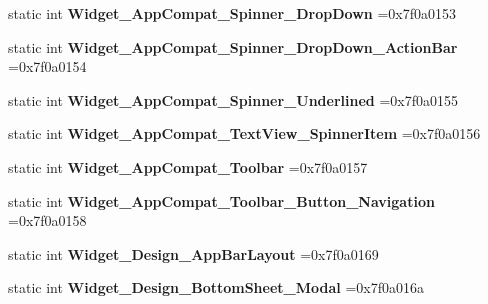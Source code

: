 \begin{DoxyCompactItemize}
static int {\bfseries Widget\+\_\+\+App\+Compat\+\_\+\+Spinner\+\_\+\+Drop\+Down} =0x7f0a0153
\item 
\mbox{\label{classandroid_1_1support_1_1v7_1_1appcompat_1_1R_1_1style_ad6537f6329d2c528f51d177fddea6053}} 
static int {\bfseries Widget\+\_\+\+App\+Compat\+\_\+\+Spinner\+\_\+\+Drop\+Down\+\_\+\+Action\+Bar} =0x7f0a0154
\item 
\mbox{\label{classandroid_1_1support_1_1v7_1_1appcompat_1_1R_1_1style_a530ac922b6f0d53b367acf7b0aa8417e}} 
static int {\bfseries Widget\+\_\+\+App\+Compat\+\_\+\+Spinner\+\_\+\+Underlined} =0x7f0a0155
\item 
\mbox{\label{classandroid_1_1support_1_1v7_1_1appcompat_1_1R_1_1style_a9c08ddc8f7db0c2fabd8737151247db9}} 
static int {\bfseries Widget\+\_\+\+App\+Compat\+\_\+\+Text\+View\+\_\+\+Spinner\+Item} =0x7f0a0156
\item 
\mbox{\label{classandroid_1_1support_1_1v7_1_1appcompat_1_1R_1_1style_adaaa0815a3ad09afeb2dfe4dd7638ca0}} 
static int {\bfseries Widget\+\_\+\+App\+Compat\+\_\+\+Toolbar} =0x7f0a0157
\item 
\mbox{\label{classandroid_1_1support_1_1v7_1_1appcompat_1_1R_1_1style_aeef700c6552cc2e055f0a47e99c049cd}} 
static int {\bfseries Widget\+\_\+\+App\+Compat\+\_\+\+Toolbar\+\_\+\+Button\+\_\+\+Navigation} =0x7f0a0158
\item 
\mbox{\label{classandroid_1_1support_1_1v7_1_1appcompat_1_1R_1_1style_a085d853745838cbc0f8c3b249b8d62f7}} 
static int {\bfseries Widget\+\_\+\+Design\+\_\+\+App\+Bar\+Layout} =0x7f0a0169
\item 
\mbox{\label{classandroid_1_1support_1_1v7_1_1appcompat_1_1R_1_1style_a3ec4e9653192f87afcf33f1b9ad3daac}} 
static int {\bfseries Widget\+\_\+\+Design\+\_\+\+Bottom\+Sheet\+\_\+\+Modal} =0x7f0a016a
\item 

\end{DoxyCompactItemize}
